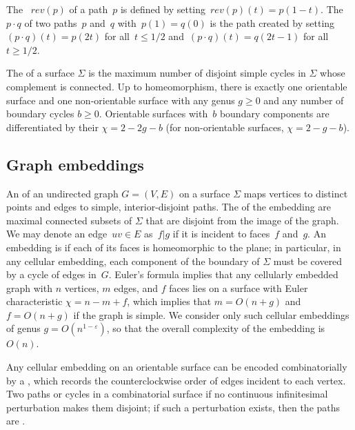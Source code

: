 \documentclass[11pt,twoside]{article}
\def\rev{\mathit{rev}}
\let\eps\varepsilon
\begin{document}
The ~$\rev(p)$ of a path~$p$ is defined by
setting~$\rev(p)(t) = p(1-t)$. The ~$p \cdot q$ of two
paths~$p$ and~$q$ with~$p(1)=q(0)$ is the path created by
setting~$(p\cdot q)(t) = p(2t)$ for all~$t \leq 1/2$
and~$(p\cdot q)(t) = q(2t-1)$ for all~$t \geq 1/2$.

The  of a surface $\Sigma$ is the maximum number of disjoint simple cycles in $\Sigma$ whose complement is connected.
 Up to homeomorphism,
there is exactly one orientable surface and one non-orientable surface with any genus $g\ge 0$ and any number of
boundary cycles $b\ge 0$.
Orientable surfaces with~$b$ boundary components are differentiated by their  ${\chi = 2 - 2g - b}$ (for non-orientable surfaces, ${\chi = 2 - g - b}$).


\subsection{Graph embeddings}
\label{SS:embeddings}


An  of an undirected graph $G=(V,E)$ on a surface $\Sigma$ maps vertices to distinct points and edges to simple, interior-disjoint paths.  The  of the embedding are maximal connected subsets of $\Sigma$ that are disjoint from the image of the graph.
We may denote an edge~$uv \in E$ as~$f | g$ if it is incident to faces~$f$ and~$g$.
An embedding is  if each of its faces is homeomorphic to the plane; in particular, in any cellular embedding, each component of the boundary of $\Sigma$ must be covered by a cycle of edges in~$G$.  Euler's formula implies that any cellularly embedded graph with $n$ vertices, $m$ edges, and $f$ faces lies on a surface with Euler characteristic $\chi = n-m+f$, which implies that $m = O(n+g)$ and $f=O(n+g)$
if the graph is simple.
We consider only such
cellular embeddings of genus $g=O(n^{1-\eps})$, so that the overall complexity of the embedding is $O(n)$.

Any cellular embedding on an orientable surface can be encoded combinatorially
by a , which records the counterclockwise order of edges
incident to each vertex.
Two paths or cycles in a combinatorial surface  if no continuous infinitesimal perturbation makes them disjoint; if such a perturbation exists, then the paths are .
\end{document}
